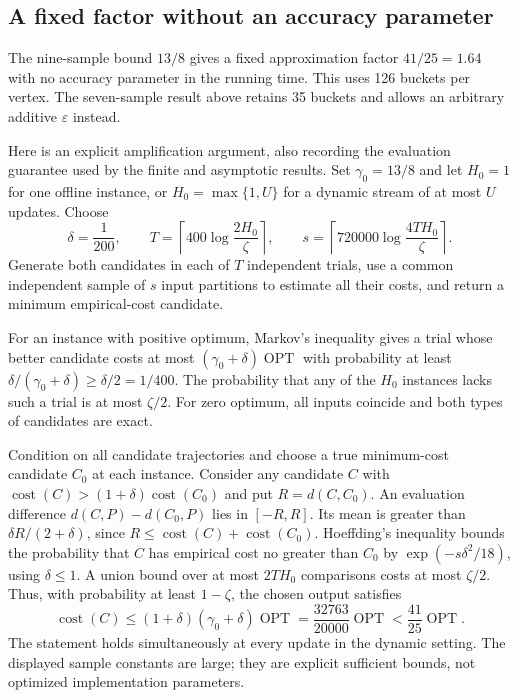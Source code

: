 \documentclass[11pt]{article}
\begin{document}
\subsection{A fixed factor without an accuracy parameter}
\label{sec:fixed-ratio-improvement}

The nine-sample bound $13/8$ gives a fixed approximation factor $41/25=1.64$
with no accuracy parameter in the running time. This uses 126 buckets
per vertex. The seven-sample result above retains 35 buckets and allows
an arbitrary additive $\varepsilon$ instead.

Here is an explicit amplification argument, also recording the
evaluation guarantee used by the finite and asymptotic results.
Set $\gamma_0=13/8$ and let $H_0=1$ for one offline instance, or
$H_0=\max\{1,U\}$ for a dynamic stream of at most $U$ updates. Choose
\[
 \delta=\frac1{200},\qquad
 T=\left\lceil400\log\frac{2H_0}{\zeta}\right\rceil,
 \qquad
 s=\left\lceil720000\log\frac{4TH_0}{\zeta}\right\rceil.
\]
Generate both candidates in each of $T$ independent trials, use a common
independent sample of $s$ input partitions to estimate all their costs,
and return a minimum empirical-cost candidate.

For an instance with positive optimum, Markov's inequality gives a
trial whose better candidate costs at most
$(\gamma_0+\delta)\operatorname{OPT}$ with probability at least
$\delta/(\gamma_0+\delta)\ge\delta/2=1/400$.
The probability that any of the $H_0$ instances lacks such a trial is
at most $\zeta/2$. For zero optimum, all inputs coincide and both types
of candidates are exact.

Condition on all candidate trajectories and choose a true minimum-cost
candidate $C_0$ at each instance. Consider any candidate $C$ with
$\operatorname{cost}(C)>(1+\delta)\operatorname{cost}(C_0)$ and put
$R=d(C,C_0)$. An evaluation difference
$d(C,P)-d(C_0,P)$ lies in $[-R,R]$. Its mean is greater than
$\delta R/(2+\delta)$, since
$R\le\operatorname{cost}(C)+\operatorname{cost}(C_0)$.
Hoeffding's inequality bounds the probability that $C$ has empirical
cost no greater than $C_0$ by
$\exp(-s\delta^2/18)$, using $\delta\le1$.
A union bound over at most $2TH_0$ comparisons costs at most $\zeta/2$.
Thus, with probability at least $1-\zeta$, the chosen output satisfies
\[
 \operatorname{cost}(C)
 \le(1+\delta)(\gamma_0+\delta)\operatorname{OPT}
 =\frac{32763}{20000}\operatorname{OPT}
 <\frac{41}{25}\operatorname{OPT}.
\]
The statement holds simultaneously at every update in the dynamic
setting. The displayed sample constants are large; they are explicit
sufficient bounds, not optimized implementation parameters.
\end{document}
